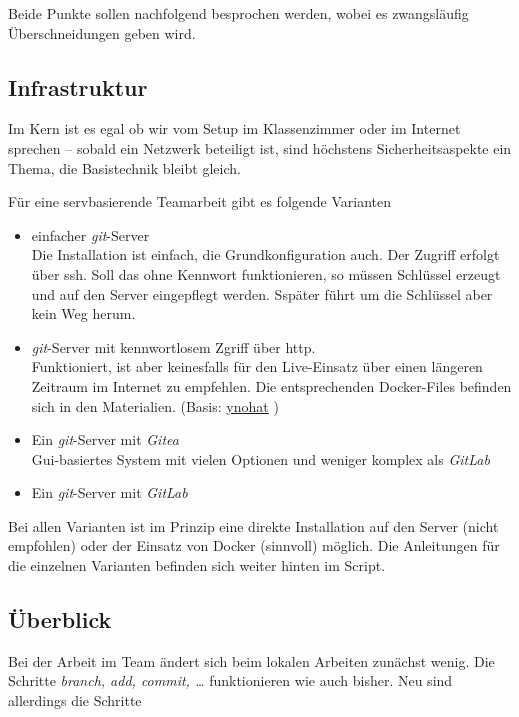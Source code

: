 \documentclass[
  letterpaper,
  DIV=11]{scrreprt}
\newcommand{\git}{\textit{git}\xspace}
\begin{document}
Beide Punkte sollen nachfolgend besprochen werden, wobei es zwangsläufig
Überschneidungen geben wird.

\subsection{Infrastruktur}\label{infrastruktur}

Im Kern ist es egal ob wir vom Setup im Klassenzimmer oder im Internet
sprechen -- sobald ein Netzwerk beteiligt ist, sind höchstens
Sicherheitsaspekte ein Thema, die Basistechnik bleibt gleich.

Für eine servbasierende Teamarbeit gibt es folgende Varianten

\begin{itemize}
\item
  einfacher \git-Server\\
  Die Installation ist einfach, die Grundkonfiguration auch. Der Zugriff
  erfolgt über ssh. Soll das ohne Kennwort funktionieren, so müssen
  Schlüssel erzeugt und auf den Server eingepflegt werden. Sspäter führt
  um die Schlüssel aber kein Weg herum.
\item
  \git-Server mit kennwortlosem Zgriff über http.\\
  Funktioniert, ist aber keinesfalls für den Live-Einsatz über einen
  längeren Zeitraum im Internet zu empfehlen. Die entsprechenden
  Docker-Files befinden sich in den Materialien. (Basis:
  \href{https://github.com/ynohat/git-http-backend}{ynohat} )
\item
  Ein \git-Server mit \emph{Gitea}\\
  Gui-basiertes System mit vielen Optionen und weniger komplex als
  \emph{GitLab}
\item
  Ein \git-Server mit \emph{GitLab}
\end{itemize}

Bei allen Varianten ist im Prinzip eine direkte Installation auf den
Server (nicht empfohlen) oder der Einsatz von Docker (sinnvoll) möglich.
Die Anleitungen für die einzelnen Varianten befinden sich weiter hinten
im Script.

\subsection{Überblick}\label{uxfcberblick}

Bei der Arbeit im Team ändert sich beim lokalen Arbeiten zunächst wenig.
Die Schritte \emph{branch, add, commit, \ldots{}} funktionieren wie auch
bisher. Neu sind allerdings die Schritte
\end{document}
